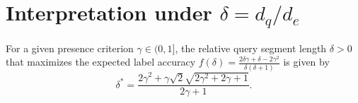 \section{Interpretation under $\delta = d_q / d_e$}

\begin{theorem}
\label{thm:optimal_delta}
For a given presence criterion $\gamma \in (0, 1]$, the relative query segment length $\delta > 0$ that maximizes the expected label accuracy $f(\delta) = \frac{2 \delta \gamma + \delta - 2 \gamma^{2}}{\delta \left(\delta + 1\right)}$ is given by
\begin{equation}
\label{eq:optimal_delta}
    \delta^* = \frac{2\gamma^2 + \gamma\sqrt{2}\sqrt{2\gamma^2 + 2\gamma + 1}}{2\gamma + 1}.
\end{equation}
\end{theorem}

